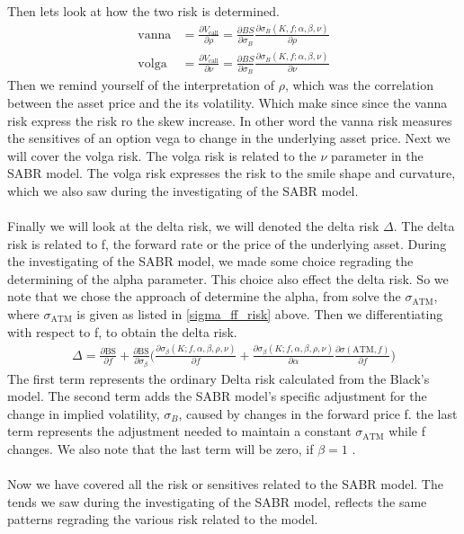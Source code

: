 Then lets look at how the two risk is determined. 
\begin{align*}
    \text{vanna} &= \frac{\partial V_{\text{call}}}{\partial \rho} = \frac{\partial BS}{\partial \sigma_B} \frac{\partial \sigma_B(K, f; \alpha, \beta, \nu)}{\partial \rho} \\
    \text{volga} &= \frac{\partial V_{\text{call}}}{\partial \nu} = \frac{\partial BS}{\partial \sigma_B} \frac{\partial \sigma_B(K, f; \alpha, \beta, \nu)}{\partial \nu}
\end{align*}
Then we remind yourself of the interpretation of $\rho$,
which was the correlation between the asset price and the its 
volatility. Which make since since the vanna risk express
the risk ro the skew increase. In other word the vanna risk 
measures the sensitives of an option  vega to change in 
the underlying asset price. Next we will cover the volga risk.
The volga risk is related to the $\nu$ parameter in the SABR model. 
The volga risk expresses the risk to the smile shape and curvature,
which we also saw during the investigating of the SABR model. 
\\\\
Finally we will look at the delta risk, we will denoted
the delta risk $\Delta$. The delta risk is related to f, the 
forward rate or the price of the underlying asset. 
During the investigating of the SABR model, we made
some choice regrading the determining of the alpha parameter.
This choice also effect the delta risk. So we note that
we chose the approach of determine the alpha, from solve the
$\sigma_{\text{ATM}}$, where $\sigma_{\text{ATM}}$ is given as 
listed in \autoref{sigma_ff_risk} above. 
Then we differentiating with respect to f, to obtain the delta risk. 
\begin{align}
    \Delta = \frac{\partial \text{BS}}{\partial f} +
     \frac{\partial \text{BS}}{\partial \sigma_\beta} 
     \Big({\frac{\partial \sigma_\beta(K; f, \alpha, \beta, \rho, \nu)}
     {\partial f}  + \frac{\partial \sigma_\beta(K; f, \alpha, \beta,
     \rho, \nu)}{\partial \alpha} 
     \frac{\partial \sigma(\text{ATM}, f)}{\partial f}}\Big)
\end{align}
The first term represents the ordinary Delta risk calculated from 
the Black's model. The second term adds the SABR model's
 specific adjustment for the change in implied volatility, 
$\sigma_B$, caused by changes in the forward price f.
the last term represents the adjustment needed to maintain a constant 
$\sigma_{\text{ATM}}$ while f changes.
We also note that the last term will be zero, if $\beta=1$ \cite{Smile}.
\\\\
Now we have covered all the risk or sensitives related to the SABR model. 
The tends we saw during the investigating of the SABR model, reflects
the same patterns regrading the various risk related to the model. 